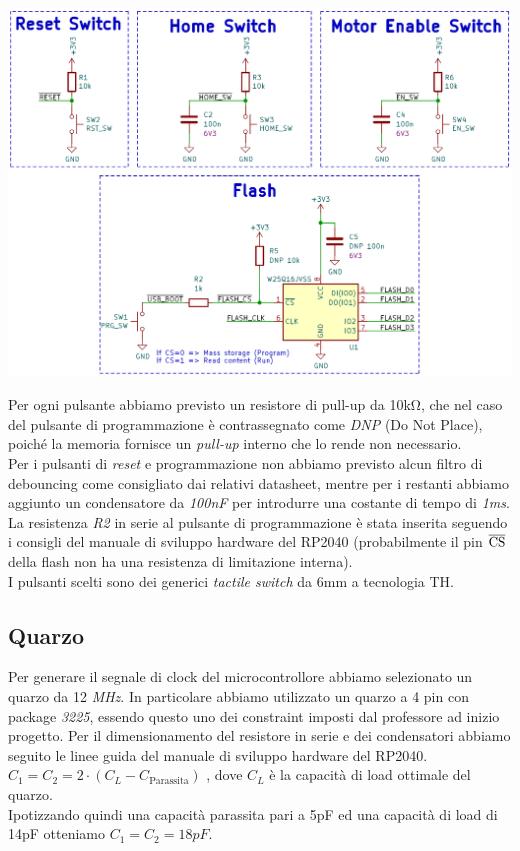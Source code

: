 \begin{center}
  \includegraphics[width=\textwidth]{figures/image16.png}
  \captionsetup{type=figure}
\end{center}

\noindent Per ogni pulsante abbiamo previsto un resistore di pull-up da 10kΩ, che
nel caso del pulsante di programmazione è contrassegnato come \emph{DNP}
(Do Not Place), poiché la memoria fornisce un \emph{pull-up} interno che
lo rende non necessario.\\
Per i pulsanti di \emph{reset} e programmazione non abbiamo previsto
alcun filtro di debouncing come consigliato dai relativi datasheet,
mentre per i restanti abbiamo aggiunto un condensatore da \emph{100nF}
per introdurre una costante di tempo di \emph{1ms}.\\
La resistenza \emph{R2} in serie al pulsante di programmazione è stata inserita
seguendo i consigli del manuale di sviluppo hardware del RP2040
(probabilmente il pin $\overline{\rm {CS}}$ della flash non ha una
resistenza di limitazione interna).\\
I pulsanti scelti sono dei generici \emph{tactile switch} da 6mm a
tecnologia TH.

\hypertarget{quarzo}{%
\subsection{Quarzo}\label{quarzo}}

Per generare il segnale di clock del microcontrollore abbiamo
selezionato un quarzo da 12 \emph{MHz}. In particolare abbiamo
utilizzato un quarzo a 4 pin con package \emph{3225}, essendo questo uno
dei constraint imposti dal professore ad inizio progetto. Per il
dimensionamento del resistore in serie e dei condensatori abbiamo
seguito le linee guida del manuale di sviluppo hardware del RP2040.\\
\(C_{1} = C_{2} = 2 \cdot (C_{L} - C_{\text{Parassita}})\)
, dove \(C_{L}\) è la capacità di load ottimale del quarzo.\\
Ipotizzando quindi una capacità parassita pari a 5pF ed una capacità di
load di 14pF otteniamo \(C_{1} = C_{2} =18pF\).

